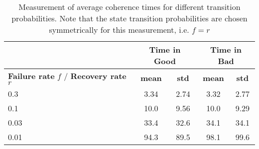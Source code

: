 \begin{table}[h]
  \begin{center}
  \begin{tabular}{|p{3.5cm}|c|c|c|c|}
  \hline 
  & \multicolumn{2}{|c|}{\textbf{Time in Good}} &
  \multicolumn{2}{|c|}{\textbf{Time in Bad}} \\
  \hline
  \textbf{Failure rate} $f$ / \textbf{Recovery rate} $r$ & \textbf{mean} & \textbf{std} & \textbf{mean}
  & \textbf{std}\\
  \hline \hline
  0.3 & 3.34 & 2.74 & 3.32 & 2.77 \\
  \hline 
  0.1 & 10.0 & 9.56 & 10.0 & 9.29 \\
  \hline 
  0.03 & 33.4 & 32.6 & 34.1 & 34.1 \\
  \hline 
  0.01 & 94.3 & 89.5 & 98.1 & 99.6 \\
  \hline 
  \end{tabular}
  \caption[Measurement of average coherence time]{Measurement of average
  coherence times for different transition probabilities. Note that the state
  transition probabilities are chosen symmetrically for this measurement, i.e.
  $f=r$}
  \label{tab:sojournTime}
\end{center}
\end{table}
